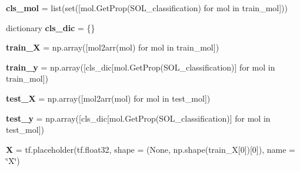 \begin{DoxyCompactItemize}
\item
\mbox{\label{namespacechemistry2quant_1_1chem2quant__NN_a96885acb316afc3fb8721ee0b7a76c3d}}
{\bfseries cls\+\_\+mol} = list(set(\mbox{[}mol.\+Get\+Prop(\textquotesingle{}S\+O\+L\+\_\+classification\textquotesingle{}) for mol in train\+\_\+mol\mbox{]}))
\item
\mbox{\label{namespacechemistry2quant_1_1chem2quant__NN_a359d880d0923047ca854cb9050359b32}}
dictionary {\bfseries cls\+\_\+dic} = \{\}
\item
\mbox{\label{namespacechemistry2quant_1_1chem2quant__NN_a06329b74e3f211dff365a79893b6cd4f}}
{\bfseries train\+\_\+X} = np.\+array(\mbox{[}mol2arr(mol) for mol in train\+\_\+mol\mbox{]})
\item
\mbox{\label{namespacechemistry2quant_1_1chem2quant__NN_a7da1862279e9df8e0305363c85e02bf8}}
{\bfseries train\+\_\+y} = np.\+array(\mbox{[}cls\+\_\+dic\mbox{[}mol.\+Get\+Prop(\textquotesingle{}S\+O\+L\+\_\+classification\textquotesingle{})\mbox{]} for mol in train\+\_\+mol\mbox{]})
\item
\mbox{\label{namespacechemistry2quant_1_1chem2quant__NN_aa5df3088953e1165b7b409826f8ff8f2}}
{\bfseries test\+\_\+X} = np.\+array(\mbox{[}mol2arr(mol) for mol in test\+\_\+mol\mbox{]})
\item
\mbox{\label{namespacechemistry2quant_1_1chem2quant__NN_a0e602d2f7f57448626ab0030b1095fa7}}
{\bfseries test\+\_\+y} = np.\+array(\mbox{[}cls\+\_\+dic\mbox{[}mol.\+Get\+Prop(\textquotesingle{}S\+O\+L\+\_\+classification\textquotesingle{})\mbox{]} for mol in test\+\_\+mol\mbox{]})
\item
\mbox{\label{namespacechemistry2quant_1_1chem2quant__NN_a058e0566d51ad7901338a7446d4f687e}}
{\bfseries X} = tf.\+placeholder(tf.\+float32, shape = (None, np.\+shape(train\+\_\+X\mbox{[}0\mbox{]})\mbox{[}0\mbox{]}), name = \char`\"{}X\char`\"{})
\item
\mbox{\label{namespacechemistry2quant_1_1chem2quant__NN_ad06d919809e5ad7f397a7106cdf2cd9d}}

\end{DoxyCompactItemize}
